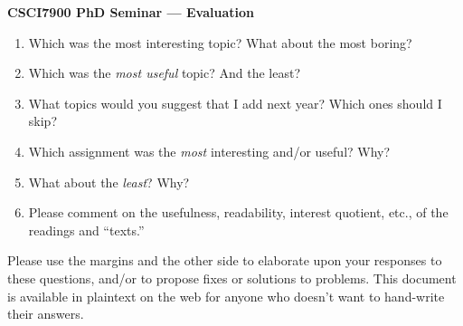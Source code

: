 \documentclass{article}
\begin{document}
\parskip=7pt
\parindent=0pt
\begin{center}
{\bf CSCI7900 PhD Seminar --- Evaluation}
\end{center}
\begin{enumerate}

\item Which was the most interesting topic?  What about the most
boring?

\vspace*{.75truein}

\item Which was the {\sl most useful} topic?  And the least?

\vspace*{.75truein}

\item What topics would you suggest that I add next year?  Which
ones should I skip?  

\vspace*{.75truein}

\item Which assignment was the {\sl most} interesting and/or useful?
Why?

\vspace*{.75truein}

\item What about the {\sl least}?  Why?

\vspace*{.75truein}

\item Please comment on the usefulness, readability, interest
quotient, etc., of the readings and ``texts.''

\vspace*{.75truein}

\end{enumerate}

\vfill

Please use the margins and the other side to elaborate upon your
responses to these questions, and/or to propose fixes or solutions to
problems.  This document is available in plaintext on the web for
anyone who doesn't want to hand-write their answers.
\end{document}
